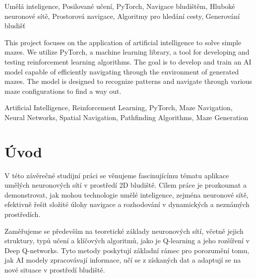 \documentclass[12pt, a4paper,
twoside,        %
openright
]{report}
\begin{document}
\noindent Umělá inteligence, Posilované učení, PyTorch, Navigace bludištěm, Hluboké neuronové sítě, Prostorová navigace, Algoritmy pro hledání cesty, Generování bludišť
\vspace{18pt}


\noindent This project focuses on the application of artificial intelligence to solve simple mazes. We utilize PyTorch, a machine learning library, a tool for developing and testing reinforcement learning algorithms. The goal is to develop and train an AI model capable of efficiently navigating through the environment of generated mazes. The model is designed to recognize patterns and navigate through various maze configurations to find a way out.

\vspace{18pt}


\noindent Artificial Intelligence, Reinforcement Learning, PyTorch, Maze Navigation, Neural Networks, Spatial Navigation, Pathfinding Algorithms, Maze Generation 

\clearpage %


\tableofcontents %

\setcounter{page}{1} %

\chapter*{Úvod}
V této závěrečné studijní práci se věnujeme fascinujícímu tématu aplikace umělých neuronových sítí v prostředí 2D bludiště. Cílem práce je prozkoumat a demonstrovat, jak mohou technologie umělé inteligence, zejména neuronové sítě, efektivně řešit složité úlohy navigace a rozhodování v dynamických a neznámých prostředích.

Zaměřujeme se především na teoretické základy neuronových sítí, včetně jejich struktury, typů učení a klíčových algoritmů, jako je Q-learning a jeho rozšíření v Deep Q-networks. Tyto metody poskytují základní rámec pro porozumění tomu, jak AI modely zpracovávají informace, učí se z získaných dat a adaptují se na nové situace v prostředí bludiště.
\end{document}

